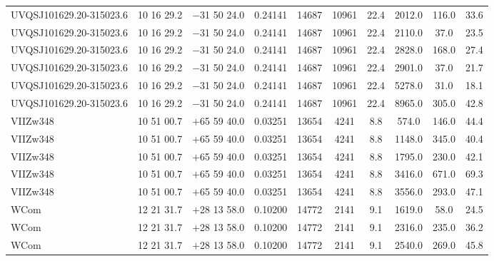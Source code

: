 \begin{landscape}
\begin{center}
\begin{longtable}{l c c c c c c c c c}
UVQSJ101629.20-315023.6  & 10 16 29.2  &         $-$31 50 24.0  &       0.24141  & 14687  &   10961  &      22.4  &      2012.0  &  116.0  &  33.6  \\
UVQSJ101629.20-315023.6  & 10 16 29.2  &         $-$31 50 24.0  &       0.24141  & 14687  &   10961  &      22.4  &      2110.0  &  37.0  &   23.5  \\
UVQSJ101629.20-315023.6  & 10 16 29.2  &         $-$31 50 24.0  &       0.24141  & 14687  &   10961  &      22.4  &      2828.0  &  168.0  &  27.4  \\
UVQSJ101629.20-315023.6  & 10 16 29.2  &         $-$31 50 24.0  &       0.24141  & 14687  &   10961  &      22.4  &      2901.0  &  37.0  &   21.7  \\
UVQSJ101629.20-315023.6  & 10 16 29.2  &         $-$31 50 24.0  &       0.24141  & 14687  &   10961  &      22.4  &      5278.0  &  31.0  &   18.1  \\
UVQSJ101629.20-315023.6  & 10 16 29.2  &         $-$31 50 24.0  &       0.24141  & 14687  &   10961  &      22.4  &      8965.0  &  305.0  &  42.8  \\
VIIZw348  &                10 51 00.7  &         $+$65 59 40.0  &       0.03251  & 13654  &   4241  &       8.8  &       574.0  &   146.0  &  44.4  \\
VIIZw348  &                10 51 00.7  &         $+$65 59 40.0  &       0.03251  & 13654  &   4241  &       8.8  &       1148.0  &  345.0  &  40.4  \\
VIIZw348  &                10 51 00.7  &         $+$65 59 40.0  &       0.03251  & 13654  &   4241  &       8.8  &       1795.0  &  230.0  &  42.1  \\
VIIZw348  &                10 51 00.7  &         $+$65 59 40.0  &       0.03251  & 13654  &   4241  &       8.8  &       3416.0  &  671.0  &  69.3  \\
VIIZw348  &                10 51 00.7  &         $+$65 59 40.0  &       0.03251  & 13654  &   4241  &       8.8  &       3556.0  &  293.0  &  47.1  \\
WCom  &                    12 21 31.7  &         $+$28 13 58.0  &       0.10200  & 14772  &   2141  &       9.1  &       1619.0  &  58.0  &   24.5  \\
WCom  &                    12 21 31.7  &         $+$28 13 58.0  &       0.10200  & 14772  &   2141  &       9.1  &       2316.0  &  235.0  &  36.2  \\
WCom  &                    12 21 31.7  &         $+$28 13 58.0  &       0.10200  & 14772  &   2141  &       9.1  &       2540.0  &  269.0  &  45.8  \\

\end{longtable}
\end{center}
\end{landscape}

